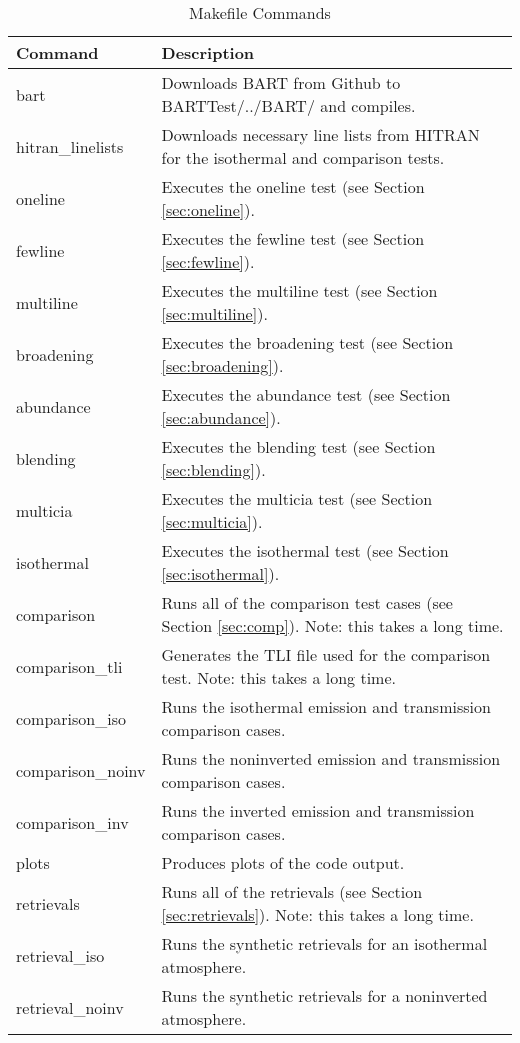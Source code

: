 \documentclass[letterpaper, 12pt]{article}
\begin{document}
\begin{table}[ht]
\label{tbl:commands}
\centering
\caption{Makefile Commands}
\begin{tabular}{ll}
\hline\hline
Command & Description\\
\hline
bart & Downloads BART from Github to BARTTest/../BART/ and compiles.\\
hitran{\_}linelists & Downloads necessary line lists from HITRAN for the 
isothermal and comparison tests.\\
oneline & Executes the oneline test (see Section \ref{sec:oneline}).\\
fewline & Executes the fewline test (see Section \ref{sec:fewline}).\\
multiline & Executes the multiline test (see Section \ref{sec:multiline}).\\
broadening & Executes the broadening test (see Section \ref{sec:broadening}).\\
abundance & Executes the abundance test (see Section \ref{sec:abundance}).\\
blending & Executes the blending test (see Section \ref{sec:blending}).\\
multicia & Executes the multicia test (see Section \ref{sec:multicia}).\\
isothermal & Executes the isothermal test (see Section \ref{sec:isothermal}).\\
comparison & Runs all of the comparison test cases (see Section \ref{sec:comp}). Note: this takes a long time.\\
comparison{\_}tli & Generates the TLI file used for the comparison test. Note: this takes a long time.\\
comparison{\_}iso & Runs the isothermal emission and transmission comparison cases.\\
comparison{\_}noinv & Runs the noninverted emission and transmission comparison 
cases.\\
comparison{\_}inv & Runs the inverted emission and transmission comparison cases.\\
plots & Produces plots of the code output.\\
retrievals & Runs all of the retrievals (see Section \ref{sec:retrievals}). Note: this takes a long time.\\
retrieval{\_}iso & Runs the synthetic retrievals for an isothermal atmosphere.\\
retrieval{\_}noinv & Runs the synthetic retrievals for a noninverted atmosphere.\\

\end{tabular}
\end{table}
\end{document}
